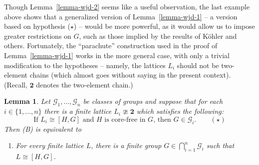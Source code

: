 \documentclass[cm,dissertation]{uhthesis}
\theoremstyle{plain}
\newtheorem{lemma}[theorem]{Lemma}
\theoremstyle{definition}
\theoremstyle{remark}
\numberwithin{theorem}{section}
\numberwithin{claim}{chapter}
\numberwithin{equation}{section}
\numberwithin{conjecture}{chapter}
\newcommand{\<}{\ensuremath{\langle}}
\renewcommand{\>}{\ensuremath{\rangle}}
\newcommand{\0}{\ensuremath{\mathbf{0}}}
\newcommand{\1}{\ensuremath{\mathbf{1}}}
\newcommand{\2}{\ensuremath{\mathbf{2}}}
\newcommand{\3}{\ensuremath{\mathbf{3}}}
\newcommand{\4}{\ensuremath{\mathbf{4}}}
\newcommand{\5}{\ensuremath{\mathbf{5}}}
\newcommand{\sG}{\ensuremath{\mathscr{G}}}
\newcommand{\two}{\ensuremath{\mathbf{2}}}
\begin{document}
Though Lemma~\ref{lemma-wjd-2} seems like a useful observation, the last example
above shows that a 
generalized version of Lemma~\ref{lemma-wjd-1} -- a version based on hypothesis ($\star$) --
would be more powerful, as it would allow us to impose greater restrictions on $G$,
such as those implied by the results of K\"ohler and others.  
Fortunately, the ``parachute''
construction used in the proof of Lemma~\ref{lemma-wjd-1} works in the more general case,
with only a trivial modification to the hypotheses -- namely, the lattices $L_i$
should not be two-element chains (which almost goes without saying in the present context).  
(Recall, $\two$ denotes the two-element chain.)
\begin{lemma}
\label{lemma-wjd-3}
Let $\sG_1, \dots, \sG_n$ be classes of groups and  
suppose that for each $i\in \{1, \dots, n\}$ there is a finite lattice $L_i\ncong \two$
which satisfies the following:  %
\[
\text{If $L_i\cong [H,G]$ and $H$ is core-free in $G$, then $G\in
  {\sG_i}$}. \qquad (\star)
\]
Then (B) is equivalent to
  \begin{enumerate}
  \item[(C)] For every finite lattice $L$, there is a finite group $G \in
    \bigcap\limits_{i=1}^n \sG_i$ such that $L \cong [H,G]$.
  \end{enumerate}
\end{lemma}
\end{document}
